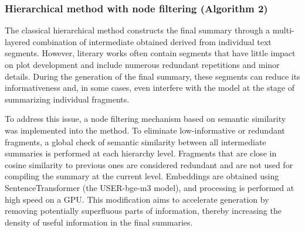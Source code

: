 \documentclass{superfri}
\begin{document}
\subsubsection{Hierarchical method with node filtering (Algorithm 2)}
The classical hierarchical method constructs the final summary through a multi-layered combination of intermediate obtained derived from individual text segments.
However, literary works often contain segments that have little impact on plot development and include numerous redundant repetitions and minor details. 
During the generation of the final summary, these segments can reduce its informativeness and, in some cases, even interfere with the model at the stage of summarizing individual fragments.

To address this issue, a node filtering mechanism based on semantic similarity was implemented into the method.
To eliminate low-informative or redundant fragments, a global check of semantic similarity between all intermediate summaries is performed at each hierarchy level.
Fragments that are close in cosine similarity to previous ones are considered redundant and are not used for compiling the summary at the current level.
Embeddings are obtained using SentenceTransformer (the USER-bge-m3 model), and processing is performed at high speed on a GPU.
This modification aims to accelerate generation by removing potentially superfluous parts of information, thereby increasing the density of useful information in the final summaries.
\end{document}
